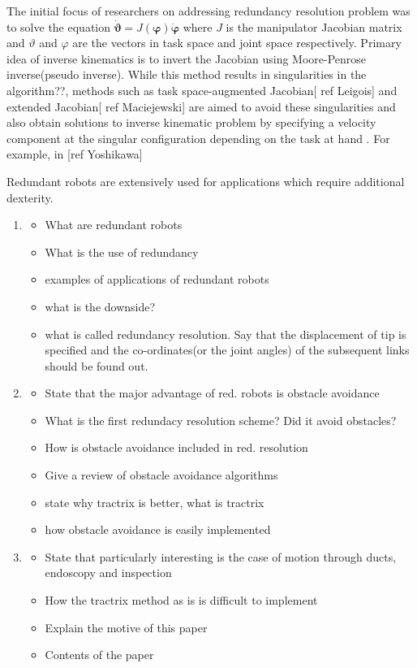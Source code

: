 \documentclass[12pt,a4]{article}
\begin{document}
The initial focus of researchers on addressing redundancy resolution problem was to solve the equation $\dot{\mathbf{\vartheta}}=J\left(\mathbf{\varphi} \right)\dot{\mathbf{\varphi}}$ where $J$ is the manipulator Jacobian matrix and $\vartheta$ and $\varphi$ are the vectors in task space and joint space respectively. Primary idea of inverse kinematics is to invert the Jacobian using Moore-Penrose inverse(pseudo inverse). While this method results in singularities in the algorithm??, methods such as task space-augmented Jacobian[ ref Leigois] and extended Jacobian[ ref Maciejewski] are aimed to avoid these singularities and also obtain solutions to inverse kinematic problem by specifying a velocity component at the singular configuration depending on the task at hand . For example, in [ref Yoshikawa]



Redundant robots are extensively used for applications which require additional dexterity. 


\begin{enumerate}
\item
\begin{itemize}
\item What are redundant robots
\item What is the use of redundancy
\item examples of applications of redundant robots
\item what is the downside?
\item what is called redundancy resolution. Say that the displacement of tip is specified and the co-ordinates(or the joint angles) of the subsequent links should be found out.
\end{itemize}

\item
\begin{itemize}
\item State that the major advantage of red. robots is obstacle avoidance
\item What is the first redundacy resolution scheme? Did it avoid obstacles?
\item How is obstacle avoidance included in red. resolution
\item Give a review of obstacle avoidance algorithms
\item state why tractrix is better, what is tractrix
\item how obstacle avoidance is easily implemented
\end{itemize}

\item
\begin{itemize}
\item State that particularly interesting is the case of motion through ducts, endoscopy and inspection
\item How the tractrix method as is is difficult to implement
\item Explain the motive of this paper
\item Contents of the paper
\end{itemize}
\end{enumerate}
\end{document}
